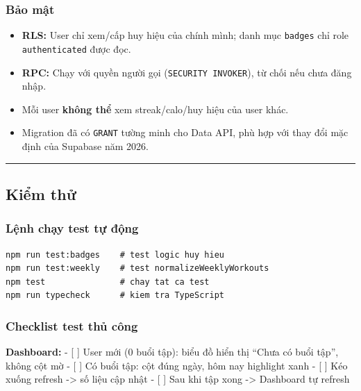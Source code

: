 \documentclass[12pt,a4paper]{article}
\providecommand{\tightlist}{%
  \setlength{\itemsep}{0pt}\setlength{\parskip}{0pt}}
\begin{document}
\subsubsection{Bảo mật}\label{bux1ea3o-mux1eadt}

\begin{itemize}
\tightlist
\item
  \textbf{RLS:} User chỉ xem/cấp huy hiệu của chính mình; danh mục
  \texttt{badges} chỉ role \texttt{authenticated} được đọc.
\item
  \textbf{RPC:} Chạy với quyền người gọi (\texttt{SECURITY\ INVOKER}),
  từ chối nếu chưa đăng nhập.
\item
  Mỗi user \textbf{không thể} xem streak/calo/huy hiệu của user khác.
\item
  Migration đã có \texttt{GRANT} tường minh cho Data API, phù hợp với
  thay đổi mặc định của Supabase năm 2026.
\end{itemize}

\begin{center}\rule{0.5\linewidth}{0.5pt}\end{center}

\subsection{Kiểm thử}\label{kiux1ec3m-thux1eed}

\subsubsection{Lệnh chạy test tự
động}\label{lux1ec7nh-chux1ea1y-test-tux1ef1-ux111ux1ed9ng}

\begin{verbatim}
npm run test:badges    # test logic huy hieu
npm run test:weekly    # test normalizeWeeklyWorkouts
npm test               # chay tat ca test
npm run typecheck      # kiem tra TypeScript

\end{verbatim}

\subsubsection{Checklist test thủ
công}\label{checklist-test-thux1ee7-cuxf4ng}

\textbf{Dashboard:} - {[} {]} User mới (0 buổi tập): biểu đồ hiển thị
``Chưa có buổi tập'', không cột mờ - {[} {]} Có buổi tập: cột đúng ngày,
hôm nay highlight xanh - {[} {]} Kéo xuống refresh -\textgreater{} số
liệu cập nhật - {[} {]} Sau khi tập xong -\textgreater{} Dashboard tự
refresh
\end{document}
